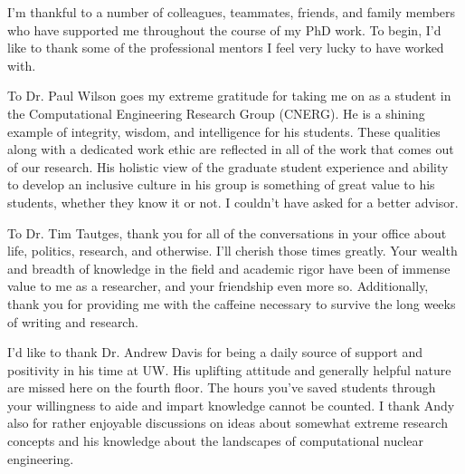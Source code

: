 



I'm thankful to a number of colleagues, teammates, friends, and family members
who have supported me throughout the course of my PhD work. To begin, I'd like
to thank some of the professional mentors I feel very lucky to have worked with.

To Dr. Paul Wilson goes my extreme gratitude for taking me on as a student in the
Computational Engineering Research Group (CNERG). He is a shining example of
integrity, wisdom, and intelligence for his 
students. These qualities along with a dedicated work ethic are reflected in all of
the work that comes out of our research. His holistic view of the graduate
student experience and ability to develop an inclusive culture in his group is
something of great value to his students, whether they 
know it or not. I couldn't have asked for a better advisor.

To Dr. Tim Tautges, thank you for all of the conversations in your office about
life, politics, research, and otherwise. I'll cherish those times greatly. Your
wealth and breadth of knowledge in the field and academic rigor have been of
immense value to me as a researcher, and your friendship even more
so. Additionally, thank you for providing me with the caffeine necessary to
survive the long weeks of writing and research.

I'd like to thank Dr. Andrew Davis for being a daily source of support and
positivity in his time at UW. His uplifting attitude and generally helpful
nature are missed here on the fourth floor. The hours you've saved students through
your willingness to aide and impart knowledge cannot be counted. I thank Andy
also for rather enjoyable discussions on ideas about somewhat extreme research
concepts and his knowledge about the landscapes of computational nuclear
engineering.

